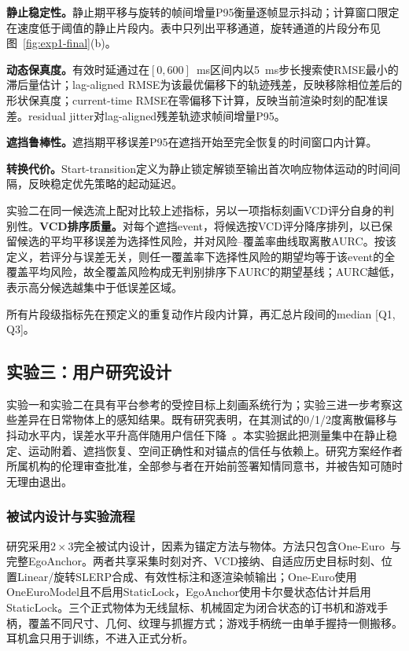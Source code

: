 \documentclass[review]{vgtc}
\begin{document}
\textbf{静止稳定性。}静止期平移与旋转的帧间增量P95衡量逐帧显示抖动；计算窗口限定在速度低于阈值的静止片段内。表中只列出平移通道，旋转通道的片段分布见图~\ref{fig:exp1-final}(b)。

\textbf{动态保真度。}有效时延通过在$[0, 600]$~ms区间内以5~ms步长搜索使RMSE最小的滞后量估计；lag-aligned RMSE为该最优偏移下的轨迹残差，反映移除相位差后的形状保真度；current-time RMSE在零偏移下计算，反映当前渲染时刻的配准误差。residual jitter对lag-aligned残差轨迹求帧间增量P95。

\textbf{遮挡鲁棒性。}遮挡期平移误差P95在遮挡开始至完全恢复的时间窗口内计算。

\textbf{转换代价。}Start-transition定义为静止锁定解锁至输出首次响应物体运动的时间间隔，反映稳定优先策略的起动延迟。

实验二在同一候选流上配对比较上述指标，另以一项指标刻画VCD评分自身的判别性。\textbf{VCD排序质量。}对每个遮挡event，将候选按VCD评分降序排列，以已保留候选的平均平移误差为选择性风险，并对风险--覆盖率曲线取离散AURC。按该定义，若评分与误差无关，则任一覆盖率下选择性风险的期望均等于该event的全覆盖平均风险，故全覆盖风险构成无判别排序下AURC的期望基线；AURC越低，表示高分候选越集中于低误差区域。

所有片段级指标先在预定义的重复动作片段内计算，再汇总片段间的median [Q1, Q3]。

\subsection{实验三：用户研究设计}\label{sec:exp3-design}

实验一和实验二在具有平台参考的受控目标上刻画系统行为；实验三进一步考察这些差异在日常物体上的感知结果。既有研究表明，在其测试的0/1/2度离散偏移与抖动水平内，误差水平升高伴随用户信任下降~\cite{gottsacker2024artrust}。本实验据此把测量集中在静止稳定、运动附着、遮挡恢复、空间正确性和对锚点的信任与依赖上。研究方案经作者所属机构的伦理审查批准，全部参与者在开始前签署知情同意书，并被告知可随时无理由退出。

\subsubsection{被试内设计与实验流程}

研究采用$2 \times 3$完全被试内设计，因素为锚定方法与物体。方法只包含One-Euro~\cite{casiez2012oneeuro}与完整EgoAnchor。两者共享采集时刻对齐、VCD接纳、自适应历史目标时刻、位置Linear/旋转SLERP合成、有效性标注和逐渲染帧输出；One-Euro使用OneEuroModel且不启用StaticLock，EgoAnchor使用卡尔曼状态估计并启用StaticLock。三个正式物体为无线鼠标、机械固定为闭合状态的订书机和游戏手柄，覆盖不同尺寸、几何、纹理与抓握方式；游戏手柄统一由单手握持一侧搬移。耳机盒只用于训练，不进入正式分析。
\end{document}
